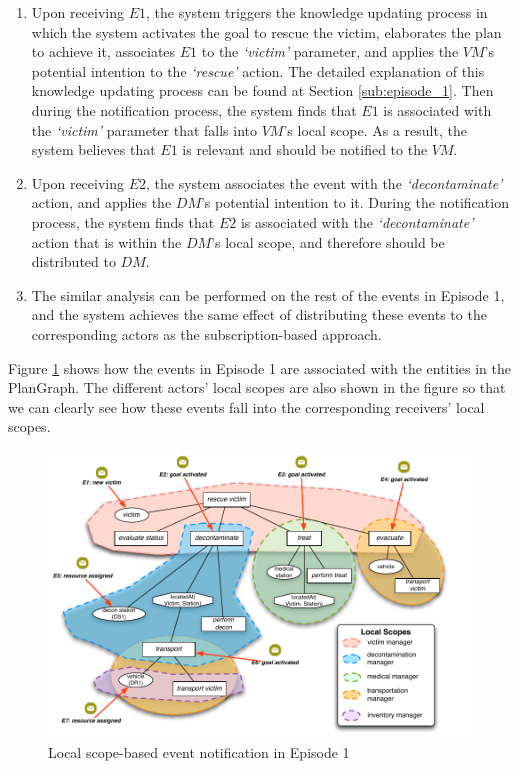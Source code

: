 \begin{enumerate}
	\item Upon receiving $E1$, the system triggers the knowledge updating process in which the system activates the goal to rescue the victim, elaborates the plan to achieve it, associates $E1$ to the \emph{`victim'} parameter, and applies the $VM$'s potential intention to the \emph{`rescue'} action. The detailed explanation of this knowledge updating process can be found at Section \ref{sub:episode_1}. Then during the notification process, the system finds that $E1$ is associated with the \emph{`victim'} parameter that falls into $VM$'s local scope. As a result, the system believes that $E1$ is relevant and should be notified to the $VM$.
	\item Upon receiving $E2$, the system associates the event with the \emph{`decontaminate'} action, and applies the $DM$'s potential intention to it. During the notification process, the system finds that $E2$ is associated with the \emph{`decontaminate'} action that is within the $DM$'s local scope, and therefore should be distributed to $DM$.
	\item The similar analysis can be performed on the rest of the events in Episode 1, and the system achieves the same effect of distributing these events to the corresponding actors as the subscription-based approach.
\end{enumerate}

Figure \ref{fig:episode_1_ls_distribution} shows how the events in Episode 1 are associated with the entities in the PlanGraph. The different actors' local scopes are also shown in the figure so that we can clearly see how these events fall into the corresponding receivers' local scopes.

\begin{figure}[htbp] %
	\centering
	\includegraphics[width=5.8in]{episode_1_ls_distribution.pdf} 
	\caption{Local scope-based event notification in Episode 1}
	\label{fig:episode_1_ls_distribution}
\end{figure}

